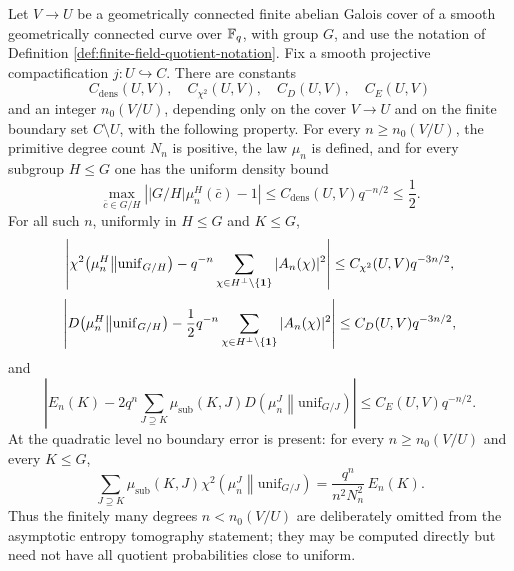 \begin{theorem}\label{thm:finite-field-chebotarev-entropy-tomography}
Let \(V\to U\) be a geometrically connected finite \etale{} abelian Galois cover of a smooth geometrically connected curve over \(\mathbb{F}_q\), with group \(G\), and use the notation of Definition \ref{def:finite-field-quotient-notation}.  Fix a smooth projective compactification \(j:U\hookrightarrow C\).  There are constants
\[
C_{\mathrm{dens}}(U,V),\quad C_{\chi^2}(U,V),\quad C_D(U,V),\quad C_E(U,V)
\]
and an integer \(n_0(V/U)\), depending only on the cover \(V\to U\) and on the finite boundary set \(C\setminus U\), with the following property.  For every \(n\ge n_0(V/U)\), the primitive degree count \(N_n\) is positive, the law \(\mu_n\) is defined, and for every subgroup \(H\le G\) one has the uniform density bound
\[
\max_{\bar c\in G/H}\left||G/H|\mu_n^H(\bar c)-1\right|
\le C_{\mathrm{dens}}(U,V)q^{-n/2}\le \frac12 .
\]
For all such \(n\), uniformly in \(H\le G\) and \(K\le G\),
\[
\left|
\chi^2\!\left(\mu_n^H\middle\|\mathrm{unif}_{G/H}\right)
-q^{-n}\sum_{\chi\in H^\perp\setminus\{\mathbf{1}\}}|A_n(\chi)|^2
\right|
\le C_{\chi^2}(U,V)q^{-3n/2},
\]
\[
\left|
D\!\left(\mu_n^H\middle\|\mathrm{unif}_{G/H}\right)
-\frac12q^{-n}\sum_{\chi\in H^\perp\setminus\{\mathbf{1}\}}|A_n(\chi)|^2
\right|
\le C_D(U,V)q^{-3n/2},
\]
and
\[
\left|
E_n(K)-2q^n\sum_{J\supseteq K}\mu_{\mathrm{sub}}(K,J)
D\!\left(\mu_n^J\middle\|\mathrm{unif}_{G/J}\right)
\right|
\le C_E(U,V)q^{-n/2}.
\]
At the quadratic level no boundary error is present: for every \(n\ge n_0(V/U)\) and every \(K\le G\),
\[
\sum_{J\supseteq K}\mu_{\mathrm{sub}}(K,J)
\chi^2\!\left(\mu_n^J\middle\|\mathrm{unif}_{G/J}\right)
=
\frac{q^n}{n^2N_n^2}\,E_n(K).
\]
Thus the finitely many degrees \(n<n_0(V/U)\) are deliberately omitted from the asymptotic entropy tomography statement; they may be computed directly but need not have all quotient probabilities close to uniform.
\end{theorem}

